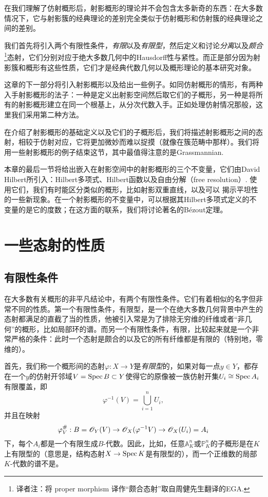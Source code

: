 在我们理解了仿射概形后，射影概形的理论并不会包含太多新奇的东西：在大多数情况下，它与射影簇的经典理论的差别完全类似于仿射概形和仿射簇的经典理论之间的差别。

我们首先将引入两个有限性条件，\textit{有限}以及\textit{有限型}，然后定义和讨论\textit{分离}以及\textit{颇合}\footnote{译者注：将 proper morphism 译作“颇合态射”取自周健先生翻译的EGA.}态射，它们分别对应于绝大多数几何中的Hausdorff性与紧性。而正是部分因为射影簇和概形有这些性质，它们才是经典代数几何以及概形理论的基本研究对象。

这章的下一部分将引入射影概形以及给出一些例子。如同仿射概形的情形，有两种入手射影概形的法子：一种是定义出射影空间然后取它们的子概形，另一种是将所有的射影概形建立在同一个根基上，从分次代数入手。正如处理仿射情况那般，这里我们采用第二种方法。

在介绍了射影概形的基础定义以及它们的子概形后，我们将描述射影概形之间的态射，相较于仿射对应，它将更加微妙而难以捉摸（就像在簇范畴中那样）。我们将用一些射影概形的例子结束这节，其中最值得注意的是Grassmannian.

本章的最后一节将给出嵌入在射影空间中的射影概形的三个不变量，它们由David Hilbert所引入：Hilbert多项式、Hilbert函数以及自由分解（free resolution）. 使用它们，我们有时能区分类似的概形，比如射影双重直线，以及可以
揭示平坦性的一些新现象。在一个射影概形的不变量中，可以根据其Hilbert多项式定义的不变量的是它的度数；在这方面的联系，我们将讨论著名的B\'{e}zout定理。

\section{一些态射的性质}

\subsection{有限性条件}

在大多数有关概形的非平凡结论中，有两个有限性条件。它们有着相似的名字但非常不同的性质。第一个有限性条件，有限型，是一个在绝大多数几何背景中产生的态射都满足的直截了当的性质，他被引入常是为了排除无穷维的纤维或者“非几何”的概形，比如局部环的谱。而另一个有限性条件，有限，比较起来就是一个非常严格的条件：此时一个态射是颇合的以及它的所有纤维都是有限的（特别地，零维的）。

首先，我们称一个概形间的态射$\varphi:X\to Y$是\textit{有限型}的，如果对每一点$y\in Y$，都存在一个$y$的仿射开邻域$V=\operatorname{Spec} B\subset Y$使得它的原像被一族仿射开集$U_i\cong \operatorname{Spec} A_i$有限覆盖，即
\[
	\varphi^{-1}(V)=\bigcup_{i=1}^n U_i,
\]
并且在映射
\[
	\varphi_V^\#:B=\mathscr{O}_Y(V)\to \mathscr{O}_X (\varphi^{-1}V)\to \mathscr{O}_X(U_i)=A_i
\]
下，每个$A_i$都是一个有限生成$B$\hyp 代数。因此，比如，任意$\mathbb{A}_K^n$或$\mathbb{P}_K^n$的子概形是在$K$上有限型的（意思是，结构态射$X\to \operatorname{Spec} K$是有限型的），而一个正维数的局部$K$\hyp 代数的谱不是。

